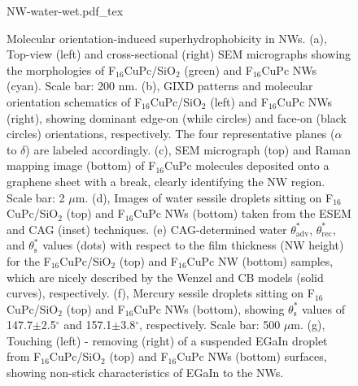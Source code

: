 \begin{figure}[htbp]
  \centering
  {NW-water-wet.pdf_tex}
\caption{\label{fig:small-water-wet} 
Molecular orientation-induced superhydrophobicity in NWs. (a), Top-view (left) and cross-sectional (right) SEM micrographs showing the morphologies of F\(_{\text{16}}\)CuPc/SiO\(_{\text{2}}\) (green) and F\(_{\text{16}}\)CuPc NWs (cyan). Scale bar: 200 nm. (b), GIXD patterns and molecular orientation schematics of F\(_{\text{16}}\)CuPc/SiO\(_{\text{2}}\) (left) and F\(_{\text{16}}\)CuPc NWs (right), showing dominant edge-on (while circles) and face-on (black circles) orientations, respectively. The four representative planes (\(\alpha\) to \(\delta\)) are labeled accordingly. (c), SEM micrograph (top) and Raman mapping image (bottom) of F\(_{\text{16}}\)CuPc molecules deposited onto a graphene sheet with a break, clearly identifying the NW region. Scale bar: 2 \(\mu\)m. (d), Images of water sessile droplets sitting on F\(_{\text{16}}\)CuPc/SiO\(_{\text{2}}\) (top) and F\(_{\text{16}}\)CuPc NWs (bottom) taken from the ESEM and CAG (inset) techniques. (e) CAG-determined water \(\theta_{\mathrm{adv}}^{*}\), \(\theta_{\mathrm{rec}}^{*}\), and \(\theta_{\mathrm{s}}^{*}\) values (dots) with respect to the film thickness (NW height) for the F\(_{\text{16}}\)CuPc/SiO\(_{\text{2}}\) (top) and F\(_{\text{16}}\)CuPc NW (bottom) samples, which are nicely described by the Wenzel and CB models (solid curves), respectively. (f), Mercury sessile droplets sitting on F\(_{\text{16}}\)CuPc/SiO\(_{\text{2}}\) (top) and F\(_{\text{16}}\)CuPc NWs (bottom), showing \(\theta_{\mathrm{s}}^{*}\) values of 147.7\(\pm\)2.5\(^{\circ}\)  and 157.1\(\pm\)3.8\(^{\circ}\), respectively. Scale bar: 500 \(\mu\)m. (g), Touching (left) - removing (right) of a suspended EGaIn droplet from F\(_{\text{16}}\)CuPc/SiO\(_{\text{2}}\) (top) and F\(_{\text{16}}\)CuPc NWs (bottom) surfaces, showing non-stick characteristics of EGaIn to the NWs.}
\end{figure}

